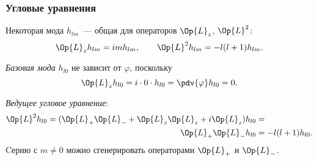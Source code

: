\documentclass[compress]{beamer}
\begin{document}

    \begin{frame}\frametitle{Угловые уравнения}

        Некоторая мода $h_{lm}$~--- общая для операторов $\Op{L}_z$, $\Op{L}^2$:
        \begin{equation*}
            \Op{L}_z h_{lm} = im h_{lm}, \qquad
            \Op{L}^2 h_{lm} = -l(l+1) h_{lm}.
        \end{equation*}

        \textit{Базовая мода} $h_{l0}$ не зависит от $\varphi$, поскольку
        \begin{equation*}
            \Op{L}_z h_{l0} = i \cdot 0 \cdot h_{l0} = \pdv{\varphi} h_{l0} = 0.
        \end{equation*}

        \textit{Ведущее угловое уравнение}:
        \begin{equation}\begin{aligned}\label{eq:killeq-hl0}
                \Op{L}^2 h_{l0} = (\Op{L}_{+}\Op{L}_{-} + \Op{L}_z\Op{L}_z + i \Op{L}_z) h_{l0} &= \\\Op{L}_{+}\Op{L}_{-} h_{l0} &= - l(l+1) h_{l0}.
        \end{aligned}\end{equation}
        Cерию с $m \neq 0$ можно сгенерировать операторами $\Op{L}_{+}$ и $\Op{L}_{-}$.

    \end{frame}

\end{document}
